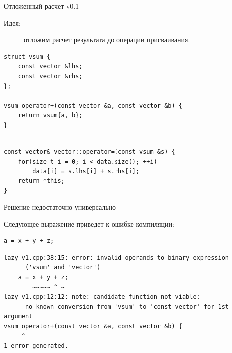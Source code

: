 \documentclass[@BEAMER_OPTIONS@]{beamer}
\begin{document}

\begin{frame}[fragile]{Отложенный расчет v0.1}
    \begin{description}
        \item[Идея:] отложим расчет результата до операции присваивания.
    \end{description}
    \pause
    \begin{exampleblock}{}
        \begin{lstlisting}
struct vsum {
    const vector &lhs;
    const vector &rhs;
};

vsum operator+(const vector &a, const vector &b) {
    return vsum{a, b};
}
        \end{lstlisting}
        \pause
        \begin{lstlisting}[firstnumber=last]

const vector& vector::operator=(const vsum &s) {
    for(size_t i = 0; i < data.size(); ++i)
        data[i] = s.lhs[i] + s.rhs[i];
    return *this;
}
        \end{lstlisting}
    \end{exampleblock}
\end{frame}

\begin{frame}[fragile]{Решение недостаточно универсально}
    \begin{exampleblock}{Следующее выражение приведет к ошибке компиляции:}
        \begin{lstlisting}
a = x + y + z;
        \end{lstlisting}
    \end{exampleblock}

    \begin{exampleblock}{}
        \begin{verbatim}
lazy_v1.cpp:38:15: error: invalid operands to binary expression
      ('vsum' and 'vector')
    a = x + y + z;
        ~~~~~ ^ ~
lazy_v1.cpp:12:12: note: candidate function not viable:
      no known conversion from 'vsum' to 'const vector' for 1st argument
vsum operator+(const vector &a, const vector &b) {
     ^
1 error generated.
        \end{verbatim}
    \end{exampleblock}
\end{frame}
\end{document}
